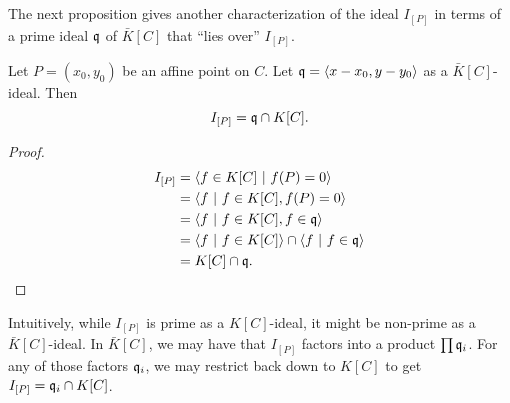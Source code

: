 The next proposition gives another characterization of the ideal $I_{[P]}$
in terms of a prime ideal $\frak q$ of $\bar K[C]$ that ``lies over'' $I_{[P]}$.
\begin{proposition}
  Let $P = (x_0, y_0)$ be an affine point on $C$.
  Let $\frak q = \left\langle x - x_0, y - y_0 \right\rangle$ as a $\bar K[C]$-ideal. Then
  \[ I_{[P]} = \frak q \cap K[C]. \]
\end{proposition}
\begin{proof}
  \begin{align*}
    I_{[P]}
      &= \left\langle  f \in K[C] ~|~ f(P) = 0  \right\rangle \\
      &= \left\langle  f ~|~ f \in K[C], f(P) = 0  \right\rangle \\
      &= \left\langle  f ~|~ f \in K[C], f \in \frak q  \right\rangle \\
      &= \left\langle  f ~|~ f \in K[C] \right\rangle \cap \left\langle  f ~|~ f \in \frak q  \right\rangle \\
      &= K[C] \cap \frak q.\qedhere
  \end{align*}
\end{proof}
Intuitively, while $I_{[P]}$ is prime as a $K[C]$-ideal, it might be non-prime as a $\bar K[C]$-ideal.
In $\bar K[C]$, we may have that $I_{[P]}$ factors into a product $\prod \frak q_i$.
For any of those factors $\frak q_i$, we may restrict back down to $K[C]$ to get $I_{[P]} = \frak q_i \cap K[C]$. 

